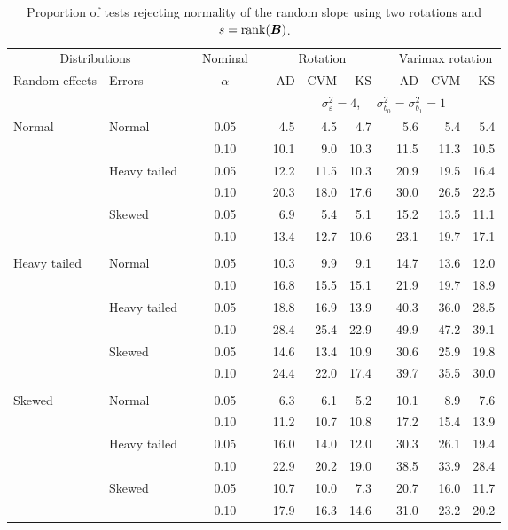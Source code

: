 


\begin{table}[ht]
\centering
\caption{\label{tab:fixedsimb1sB} Proportion of tests rejecting normality of the random slope using two rotations and $s = \operatorname{rank}(\bm{B})$.}
\begin{scriptsize}
\begin{tabular}{ll p{.1cm} c p{.1cm} rrr p{.1cm} rrr}
  \hline
  \multicolumn{2}{c}{Distributions}& & Nominal & &  \multicolumn{3}{c}{Rotation} & & \multicolumn{3}{c}{Varimax rotation} \\ \cline{1-2} \cline{6-8} \cline{10-12}   
  Random effects & Errors & & $\alpha$ & & AD & CVM & KS & & AD & CVM & KS \\ 
   \hline
& && && \multicolumn{7}{c}{$\sigma_{\varepsilon}^2 = 4$, \ \ $\sigma_{b_0}^2 = \sigma_{b_1}^2 = 1$} \\ \cline{6-12}
\rowcolor{gray!20} Normal & Normal &  & 0.05 &  & 4.5 & 4.5 & 4.7 &  & 5.6 & 5.4 & 5.4 \\ 
\rowcolor{gray!20}    &  &  & 0.10 &  & 10.1 & 9.0 & 10.3 &  & 11.5 & 11.3 & 10.5 \\ 
\rowcolor{gray!20}    & Heavy tailed &  & 0.05 &  & 12.2 & 11.5 & 10.3 &  & 20.9 & 19.5 & 16.4 \\ 
\rowcolor{gray!20}    &  &  & 0.10 &  & 20.3 & 18.0 & 17.6 &  & 30.0 & 26.5 & 22.5 \\ 
\rowcolor{gray!20}    & Skewed &  & 0.05 &  & 6.9 & 5.4 & 5.1 &  & 15.2 & 13.5 & 11.1 \\ 
\rowcolor{gray!20}    &  &  & 0.10 &  & 13.4 & 12.7 & 10.6 &  & 23.1 & 19.7 & 17.1 \\ 
&&&&&&&&&&&\\
  Heavy tailed & Normal &  & 0.05 &  & 10.3 & 9.9 & 9.1 &  & 14.7 & 13.6 & 12.0 \\ 
   &  &  & 0.10 &  & 16.8 & 15.5 & 15.1 &  & 21.9 & 19.7 & 18.9 \\ 
   & Heavy tailed &  & 0.05 &  & 18.8 & 16.9 & 13.9 &  & 40.3 & 36.0 & 28.5 \\ 
   & &  & 0.10 &  & 28.4 & 25.4 & 22.9 &  & 49.9 & 47.2 & 39.1 \\ 
   & Skewed &  & 0.05 &  & 14.6 & 13.4 & 10.9 &  & 30.6 & 25.9 & 19.8 \\ 
   &  &  & 0.10 &  & 24.4 & 22.0 & 17.4 &  & 39.7 & 35.5 & 30.0 \\ 
&&&&&&&&&&&\\
  Skewed & Normal &  & 0.05 &  & 6.3 & 6.1 & 5.2 &  & 10.1 & 8.9 & 7.6 \\ 
   &  &  & 0.10 &  & 11.2 & 10.7 & 10.8 &  & 17.2 & 15.4 & 13.9 \\ 
   & Heavy tailed &  & 0.05 &  & 16.0 & 14.0 & 12.0 &  & 30.3 & 26.1 & 19.4 \\ 
   & &  & 0.10 &  & 22.9 & 20.2 & 19.0 &  & 38.5 & 33.9 & 28.4 \\ 
   & Skewed &  & 0.05 &  & 10.7 & 10.0 & 7.3 &  & 20.7 & 16.0 & 11.7 \\ 
   &  &  & 0.10 &  & 17.9 & 16.3 & 14.6 &  & 31.0 & 23.2 & 20.2 \\ 


\end{tabular}
\end{scriptsize}
\end{table}
